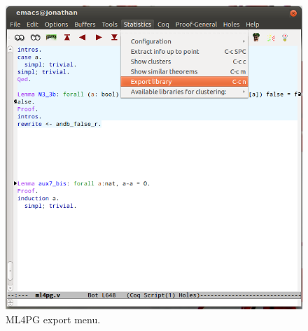 \documentclass[10pt]{article}
\begin{document}
\begin{figure}
 \centering
 \includegraphics[scale=0.4]{images/export.png}
 \caption{ML4PG export menu.}\label{export}
\end{figure}








 
 
 


 
\end{document}
